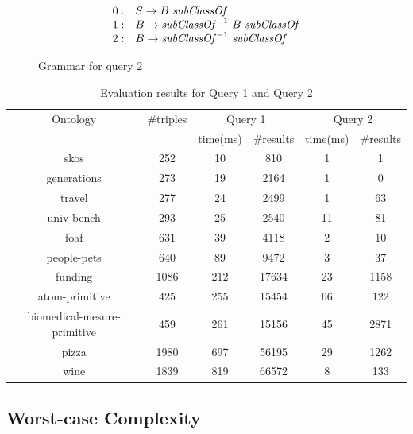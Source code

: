 \begin{figure}[ht]
   \begin{center}
   \[
\begin{array}{rl}
   0: & S \rightarrow B \ \text{\textit{subClassOf}} \\ 
   1: & B \rightarrow \text{\textit{subClassOf}}^{-1} \ B \ \text{\textit{subClassOf}} \\
   2: & B \rightarrow \text{\textit{subClassOf}}^{-1} \ \text{\textit{subClassOf}} \\ 
\end{array}
\]
   \caption{Grammar for query 2}
   \label{grammarQ2}        
   \end{center}
\end{figure}


\begin{table}
\centering
\caption{Evaluation results for Query 1 and Query 2}
\label{tbl1}

\begin{tabular}{ | c | c | c | c | c | c |}
\hline
Ontology & \#triples & \multicolumn{2}{|c|}{Query 1} & \multicolumn{2}{|c|}{Query 2} \\
\cline{3-6}
& & time(ms) & \#results & time(ms) & \#results \\
\hline 
\hline
skos        & 252 & 10 & 810 & 1 & 1 \\
generations & 273 & 19 & 2164 & 1 & 0 \\
travel      & 277 & 24 & 2499 & 1 & 63 \\
univ-bench  & 293 & 25 & 2540 & 11 & 81 \\
foaf        & 631 & 39 & 4118 & 2 & 10 \\
people-pets & 640 & 89 & 9472 & 3 & 37 \\
funding     & 1086 & 212 & 17634 & 23 & 1158 \\
atom-primitive & 425 & 255 & 15454 & 66 & 122 \\
biomedical-mesure-primitive & 459 & 261 & 15156 & 45 & 2871 \\
pizza       & 1980 & 697 & 56195 & 29 & 1262 \\
wine        & 1839 & 819 & 66572 & 8 & 133 \\
\hline
\end{tabular}

\end{table}

\subsection{Worst-case Complexity} 

